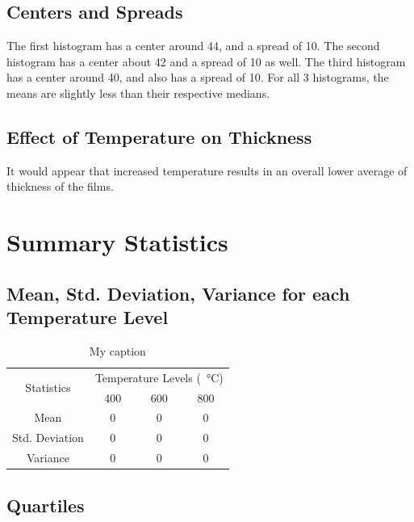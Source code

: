 \documentclass[letterpaper]{article}
\begin{document}
  \subsection{Centers and Spreads}
    The first histogram has a center around 44, and a spread of 10.
    The second histogram has a center about 42 and a spread of 10 as well.
    The third histogram has a center around 40, and also has a spread of 10.
    For all 3 histograms, the means are slightly less than their respective medians.


  \subsection{Effect of Temperature on Thickness}
    It would appear that increased temperature results in an overall lower average of thickness of the films.

\section{Summary Statistics}

  \subsection{Mean, Std. Deviation, Variance for each Temperature Level}

    \begin{table}[H]
    \centering
    \begin{tabular}{c|c|c|c|}
    \multirow{2}{*}{Statistics} & \multicolumn{3}{c|}{Temperature Levels (\SI{}{\celsius})} \\ \cline{2-4}
                                & 400           & 600          & 800          \\ \hline
    Mean                        & 0             & 0            & 0            \\ \hline
    Std. Deviation              & 0             & 0            & 0            \\ \hline
    Variance                    & 0             & 0            & 0            \\ \hline
    \end{tabular}
    \caption{My caption}
    \label{tempmean}
    \end{table}


  \subsection{Quartiles}
\end{document}
